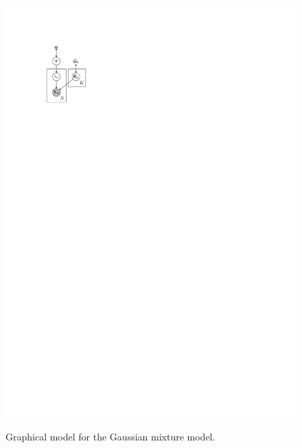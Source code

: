 \begin{figure}[h!]
    \centering
        \includegraphics{models/gmm/figures/gmm}
    \label{fig:models/gmm/figures/gmm}
    \caption{Graphical model for the Gaussian mixture model.}
\end{figure}



